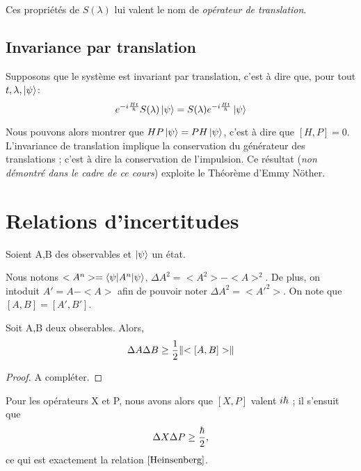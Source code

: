 \documentclass[../Notesdecours.tex]{subfiles}
\begin{document}
Ces propriétés de $S(\lambda)$ lui valent le nom de \emph{opérateur de translation}.

\subsection{Invariance par translation}
Supposons que le système est invariant par translation, c'est à dire que, pour tout $t,\lambda,\ket{\psi}$:
\begin{equation}
	e^{-i\frac{Ht}{\hbar}}S(\lambda)\ket{\psi} = S(\lambda)e^{-i\frac{Ht}{\hbar}}\ket{\psi}
\end{equation}

Nous pouvons alors montrer que $HP\ket{\psi} = PH\ket{\psi}$, c'est à dire que $[H,P] = 0$.\\

L'invariance de translation implique la conservation du générateur des translations ; c'est à dire la conservation de l'impulsion. Ce résultat (\emph{non démontré dans le cadre de ce cours}) exploite le Théorème d'Emmy Nöther.

\section{Relations d'incertitudes}
Soient A,B des observables et $\ket{\psi}$ un état.

\begin{remark}
	Nous notons $<A^n> = \braket{\psi|A^n|\psi}$, $\Delta A^2 = <A^2> - <A>^2$. De plus, on intoduit $A' = A-<A>$ afin de pouvoir noter $\Delta A^2 = <A'^2>$. On note que $[A,B] = [A',B']$.
\end{remark}

\begin{theorem}
	Soit A,B deux obserables. Alors,
	\begin{equation}
		\Delta A\Delta B \geq \frac{1}{2} \norm{<[A,B]>}
	\end{equation}
\end{theorem}

\begin{proof}
	\color{red} A compléter.
\end{proof}
\color{black}
Pour les opérateurs X et P, nous avons alors que $[X,P]$ valent $i\hbar$ ; il s'ensuit que
\begin{equation*}
	\Delta X \Delta P \geq \frac{\hbar}{2},
\end{equation*}
ce qui est exactement la relation $\eqref{Heinsenberg}$.
\end{document}
